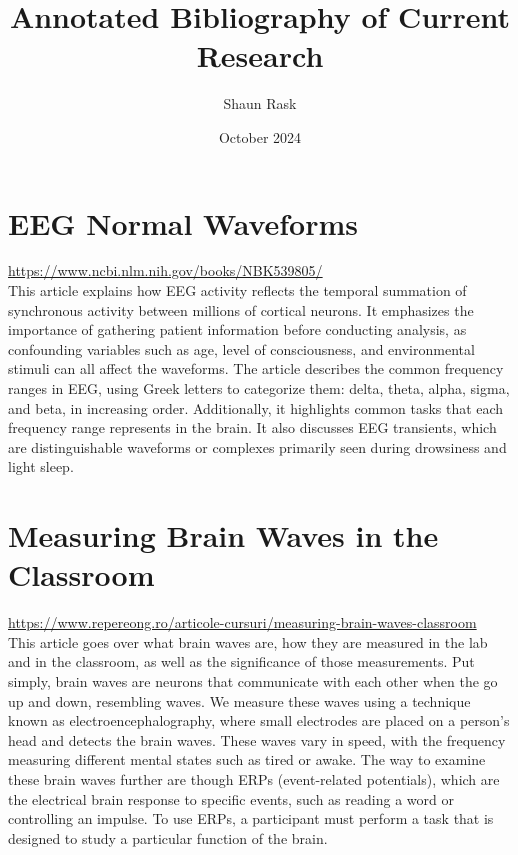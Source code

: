 \documentclass[12pt]{article}
\title{Annotated Bibliography of Current Research}
\author{Shaun Rask}
\date{October 2024}
\begin{document}
\maketitle

\section{EEG Normal Waveforms}
\url{https://www.ncbi.nlm.nih.gov/books/NBK539805/} \\
This article explains how EEG activity reflects the temporal summation of synchronous activity between millions of cortical neurons. It emphasizes the importance of gathering patient information before conducting analysis, as confounding variables such as age, level of consciousness, and environmental stimuli can all affect the waveforms. The article describes the common frequency ranges in EEG, using Greek letters to categorize them: delta, theta, alpha, sigma, and beta, in increasing order. Additionally, it highlights common tasks that each frequency range represents in the brain. It also discusses EEG transients, which are distinguishable waveforms or complexes primarily seen during drowsiness and light sleep.


\section{Measuring Brain Waves in the Classroom}
\url{https://www.repereong.ro/articole-cursuri/measuring-brain-waves-classroom} \\
This article goes over what brain waves are, how they are measured in the lab and in the classroom, as well as the significance of those measurements. Put simply, brain waves are neurons that communicate with each other when the go up and down, resembling waves. We measure these waves using a technique known as electroencephalography, where small electrodes are placed on a person's head and detects the brain waves. These waves vary in speed, with the frequency measuring different mental states such as tired or awake. The way to examine these brain waves further are though ERPs (event-related potentials), which are the electrical brain response to specific events, such as reading a word or controlling an impulse. To use ERPs, a participant must perform a task that is designed to study a particular function of the brain. 
\end{document}
